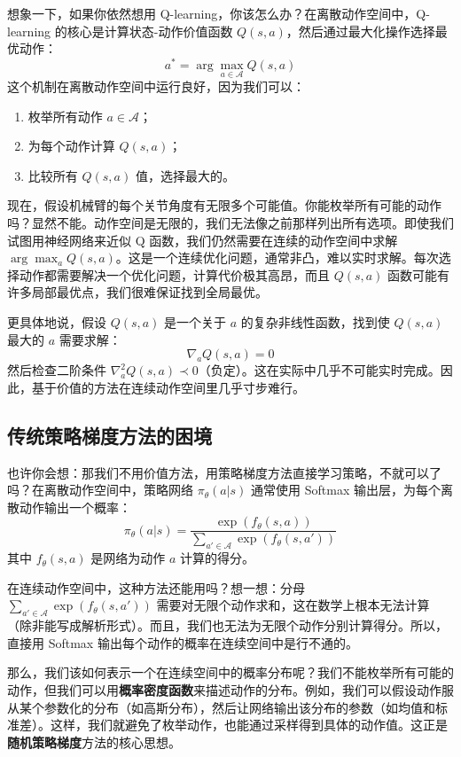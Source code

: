 \documentclass[lang=cn,zihao=-4,a4paper,fontset=windows]{beautybook}
\begin{document}
想象一下，如果你依然想用 Q-learning，你该怎么办？在离散动作空间中，Q-learning 的核心是计算状态-动作价值函数 $Q(s,a)$，然后通过最大化操作选择最优动作：
\[
a^* = \arg\max_{a \in \mathcal{A}} Q(s,a)
\]
这个机制在离散动作空间中运行良好，因为我们可以：
\begin{enumerate}
    \item 枚举所有动作 $a \in \mathcal{A}$；
    \item 为每个动作计算 $Q(s,a)$；
    \item 比较所有 $Q(s,a)$ 值，选择最大的。
\end{enumerate}

现在，假设机械臂的每个关节角度有无限多个可能值。你能枚举所有可能的动作吗？显然不能。动作空间是无限的，我们无法像之前那样列出所有选项。即使我们试图用神经网络来近似 Q 函数，我们仍然需要在连续的动作空间中求解 $\arg\max_a Q(s,a)$。这是一个连续优化问题，通常非凸，难以实时求解。每次选择动作都需要解决一个优化问题，计算代价极其高昂，而且 $Q(s,a)$ 函数可能有许多局部最优点，我们很难保证找到全局最优。

更具体地说，假设 $Q(s,a)$ 是一个关于 $a$ 的复杂非线性函数，找到使 $Q(s,a)$ 最大的 $a$ 需要求解：
\[
\nabla_a Q(s,a) = 0
\]
然后检查二阶条件 $\nabla_a^2 Q(s,a) \prec 0$（负定）。这在实际中几乎不可能实时完成。因此，基于价值的方法在连续动作空间里几乎寸步难行。

\subsection{传统策略梯度方法的困境}

也许你会想：那我们不用价值方法，用策略梯度方法直接学习策略，不就可以了吗？在离散动作空间中，策略网络 $\pi_\theta(a|s)$ 通常使用 Softmax 输出层，为每个离散动作输出一个概率：
\[
\pi_\theta(a|s) = \frac{\exp(f_\theta(s,a))}{\sum_{a' \in \mathcal{A}} \exp(f_\theta(s,a'))}
\]
其中 $f_\theta(s,a)$ 是网络为动作 $a$ 计算的得分。

在连续动作空间中，这种方法还能用吗？想一想：分母 $\sum_{a' \in \mathcal{A}} \exp(f_\theta(s,a'))$ 需要对无限个动作求和，这在数学上根本无法计算（除非能写成解析形式）。而且，我们也无法为无限个动作分别计算得分。所以，直接用 Softmax 输出每个动作的概率在连续空间中是行不通的。

那么，我们该如何表示一个在连续空间中的概率分布呢？我们不能枚举所有可能的动作，但我们可以用\textbf{概率密度函数}来描述动作的分布。例如，我们可以假设动作服从某个参数化的分布（如高斯分布），然后让网络输出该分布的参数（如均值和标准差）。这样，我们就避免了枚举动作，也能通过采样得到具体的动作值。这正是\textbf{随机策略梯度}方法的核心思想。
\end{document}
